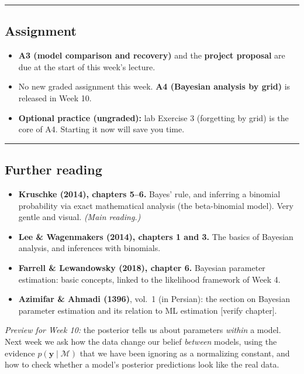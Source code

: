 \begin{center}\rule{0.5\linewidth}{0.5pt}\end{center}

\subsection{Assignment}

\begin{itemize}
\tightlist
\item
  \textbf{A3 (model comparison and recovery)} and the \textbf{project
  proposal} are due at the start of this week's lecture.
\item
  No new graded assignment this week. \textbf{A4 (Bayesian analysis by
  grid)} is released in Week 10.
\item
  \textbf{Optional practice (ungraded):} lab Exercise 3 (forgetting by
  grid) is the core of A4. Starting it now will save you time.
\end{itemize}

\begin{center}\rule{0.5\linewidth}{0.5pt}\end{center}

\subsection{Further reading}

\begin{itemize}
\tightlist
\item
  \textbf{Kruschke (2014), chapters 5--6.} Bayes' rule, and inferring a
  binomial probability via exact mathematical analysis (the
  beta-binomial model). Very gentle and visual. \emph{(Main reading.)}
\item
  \textbf{Lee \& Wagenmakers (2014), chapters 1 and 3.} The basics of
  Bayesian analysis, and inferences with binomials.
\item
  \textbf{Farrell \& Lewandowsky (2018), chapter 6.} Bayesian parameter
  estimation: basic concepts, linked to the likelihood framework of Week
  4.
\item
  \textbf{Azimifar \& Ahmadi (1396)}, vol.~1 (in Persian): the section
  on Bayesian parameter estimation and its relation to ML estimation
  {[}verify chapter{]}.
\end{itemize}

\emph{Preview for Week 10:} the posterior tells us about parameters
\emph{within} a model. Next week we ask how the data change our belief
\emph{between} models, using the evidence
\(p(\mathbf{y}\mid\mathcal{M})\) that we have been ignoring as a
normalizing constant, and how to check whether a model's posterior
predictions look like the real data.
